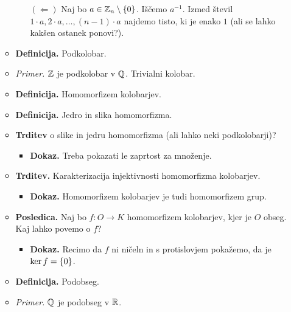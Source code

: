 \begin{enumerate}
\begin{itemize}
\begin{itemize}
            $(\Leftarrow)$ Naj bo $a \in \mathbb{Z}_n \setminus \left\{0\right\}$. Iščemo $a^{-1}$. Izmed števil $1 \cdot a, 2 \cdot a, \ldots, (n-1) \cdot a$ najdemo tisto, ki je enako $1$ (ali se lahko kakšen ostanek ponovi?). 
        \end{itemize}
        \item \colorbox{purple!30}{\textbf{Definicija.}} Podkolobar. 
        \item \colorbox{yellow!30}{\emph{Primer.}} $\mathbb{Z}$ je podkolobar v $\mathbb{Q}$. Trivialni kolobar.
        \item \colorbox{purple!30}{\textbf{Definicija.}} Homomorfizem kolobarjev.
        \item \colorbox{purple!30}{\textbf{Definicija.}} Jedro in slika homomorfizma.
        \item \colorbox{blue!30}{\textbf{Trditev}} o slike in jedru homomorfizma (ali lahko neki podkolobarji)?
        \begin{itemize}
            \item \colorbox{green!30}{\textbf{Dokaz.}} Treba pokazati le zaprtost za množenje.
        \end{itemize}
        \item \colorbox{blue!30}{\textbf{Trditev.}} Karakterizacija injektivnosti homomorfizma kolobarjev.
        \begin{itemize}
            \item \colorbox{green!30}{\textbf{Dokaz.}} Homomorfizem kolobarjev je tudi homomorfizem grup.
        \end{itemize}
        \item \colorbox{orange!30}{\textbf{Posledica.}} Naj bo $f: O \to K$ homomorfizem kolobarjev, kjer je $O$ obseg. Kaj lahko povemo o $f$?
        \begin{itemize}
            \item \colorbox{green!30}{\textbf{Dokaz.}} Recimo da $f$ ni ničeln in s protislovjem pokažemo, da je $\ker f = \left\{0\right\}$.
        \end{itemize} 
        \item \colorbox{purple!30}{\textbf{Definicija.}} Podobseg. 
        \item \colorbox{yellow!30}{\emph{Primer.}} $\mathbb{Q}$ je podobseg v $\mathbb{R}$.
    \end{itemize}
    

\end{enumerate}
